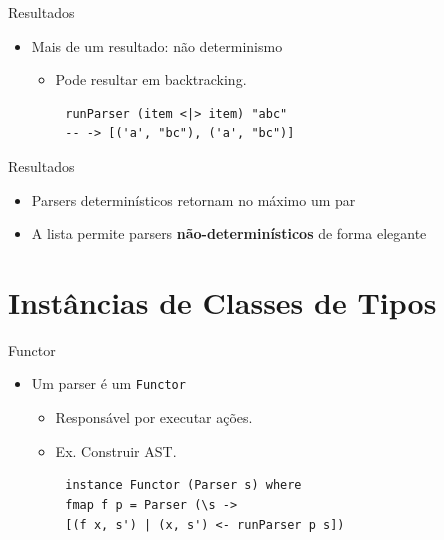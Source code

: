 \begin{frame}[fragile]{Resultados}

    \begin{itemize}

        \item
        Mais de um resultado: não determinismo

        \begin{itemize}

            \item
            Pode resultar em backtracking.
        \end{itemize}
    \end{itemize}

    \begin{lstlisting}
        runParser (item <|> item) "abc"
        -- -> [('a', "bc"), ('a', "bc")]
    \end{lstlisting}
\end{frame}

\begin{frame}{Resultados}

    \begin{itemize}

        \item
        Parsers determinísticos retornam no máximo um par
        \item
        A lista permite parsers \textbf{não-determinísticos} de forma elegante
    \end{itemize}
\end{frame}


\section{Instâncias de Classes de
Tipos}\label{instuxe2ncias-de-classes-de-tipos}

\begin{frame}[fragile]{Functor}

    \begin{itemize}

        \item
        Um parser é um \texttt{Functor}

        \begin{itemize}

            \item
            Responsável por executar ações.
            \item
            Ex. Construir AST.
        \end{itemize}
    \end{itemize}

    \begin{lstlisting}
        instance Functor (Parser s) where
        fmap f p = Parser (\s ->
        [(f x, s') | (x, s') <- runParser p s])
    \end{lstlisting}
\end{frame}

